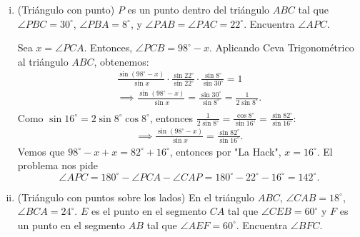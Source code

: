 \documentclass[11pt]{scrartcl}
\begin{document}
    \begin{enumerate}[i)] 
        \item (Triángulo con punto) $P$ es un punto dentro del triángulo $ABC$ tal que $\angle PBC = 30^{\circ}$, $\angle PBA = 8^{\circ}$, y $\angle PAB = \angle PAC = 22^{\circ}$. Encuentra $\angle APC$.

        \begin{soln} 
            Sea $x=\angle PCA$. Entonces, $\angle PCB= 98^{\circ}-x$. Aplicando Ceva Trigonométrico al triángulo $ABC$, obtenemos:
            \begin{align*}
                \frac{\sin (98^{\circ}-x)}{\sin x}\cdot \frac{\sin 22^{\circ}}{\sin 22^{\circ}}\cdot \frac{\sin 8^{\circ}}{\sin 30^{\circ}}=1\\
                \implies \frac{\sin (98^{\circ}-x)}{\sin x}=\frac{\sin 30^{\circ}}{\sin 8^{\circ}}=\frac{1}{2\sin 8^{\circ}}.\\
            \end{align*}
            Como $\sin 16^{\circ} = 2\sin 8^{\circ}\cos 8^{\circ}$, entonces $\frac{1}{2\sin 8^{\circ}}=\frac{\cos 8^{\circ}}{\sin 16^{\circ}}=\frac{\sin 82^{\circ}}{\sin 16^{\circ}}$:
            \begin{align*}
                \implies \frac{\sin (98^{\circ}-x)}{\sin x}=\frac{\sin 82^{\circ}}{\sin 16^{\circ}}.
            \end{align*}
            Vemos que $98^{\circ}-x+x=82^{\circ}+16^{\circ}$, entonces por "La Hack", $x=16^{\circ}$. El problema nos pide \[\angle APC = 180^{\circ}-\angle PCA - \angle CAP = 180^{\circ}-22^{\circ}-16^{\circ} = \boxed{142^{\circ}}.\]
        \end{soln}

        \item (Triángulo con puntos sobre los lados) En el triángulo $ABC$, $\angle CAB = 18^{\circ}$, $\angle BCA = 24 ^{\circ}$. $E$ es el punto en el segmento $CA$ tal que $\angle CEB = 60^{\circ}$ y $F$ es un punto en el segmento $AB$ tal que $\angle AEF = 60^{\circ}$. Encuentra $\angle BFC$.


\end{enumerate}
\end{document}
